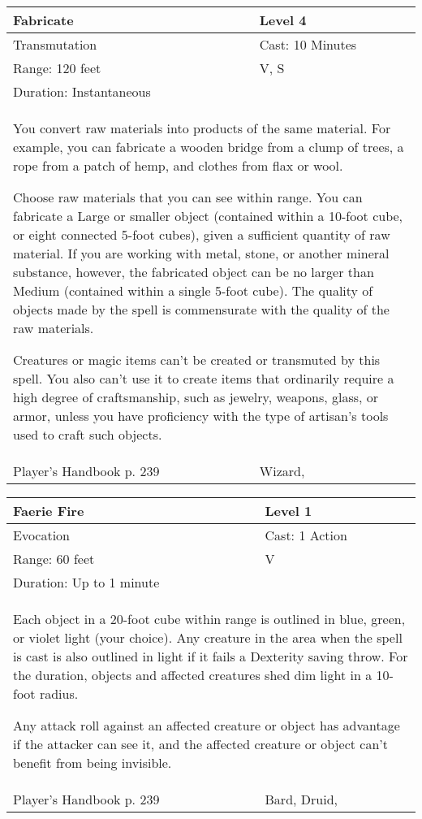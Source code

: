\documentclass[11pt]{report}
\begin{document}
\begin{table}[H]
	\begin{tabular}{||p{6cm}|p{6cm}||}
		\hline\hline
		\bf{Fabricate} & Level 4\\ \hline
		Transmutation & Cast: 10 Minutes\\ \hline
		Range: 120 feet & V, S\\ \hline
		Duration: Instantaneous & \\ \hline
		\multicolumn{2}{||p{12cm}||}{You convert raw materials into products of the same material. 
For example, you can fabricate a wooden bridge from a clump of trees, a rope from a patch of hemp, and clothes from flax or wool. 

Choose raw materials that you can see within range. You can fabricate a Large or smaller object (contained within a 10-foot cube, or eight connected 5-foot cubes), given a sufficient quantity of raw material. If you are working with metal, stone, or another mineral substance, however, the fabricated object can be no larger than Medium (contained within a single 5-foot cube). The quality of objects made by the spell is commensurate with the quality of the raw materials. 

Creatures or magic items can’t be created or transmuted by this spell. You also can’t use it to create items that ordinarily require a high degree of craftsmanship, such as jewelry, weapons, glass, or armor, unless you have proficiency with the type of artisan’s tools used to craft such objects.}\\ \hline
Player's Handbook p. 239 & Wizard, \\ \hline\hline
	\end{tabular}
\end{table}

\begin{table}[H]
	\begin{tabular}{||p{6cm}|p{6cm}||}
		\hline\hline
		\bf{Faerie Fire} & Level 1\\ \hline
		Evocation & Cast: 1 Action\\ \hline
		Range: 60 feet & V\\ \hline
		Duration: Up to 1 minute & \\ \hline
		\multicolumn{2}{||p{12cm}||}{Each object in a 20-foot cube within range is outlined in blue, green, or violet light (your choice). 
Any creature in the area when the spell is cast is also outlined in light if it fails a Dexterity saving throw. For the duration, objects and affected creatures shed dim light in a 10-foot radius. 

Any attack roll against an affected creature or object has advantage if the attacker can see it, and the affected creature or object can’t benefit from being invisible.}\\ \hline
Player's Handbook p. 239 & Bard, Druid, \\ \hline\hline
	\end{tabular}
\end{table}
\end{document}
